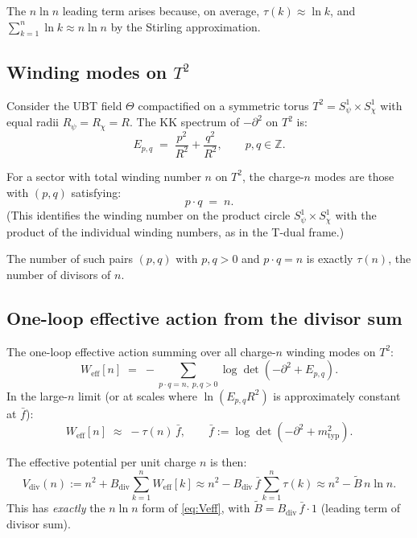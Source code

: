\documentclass[12pt,a4paper]{article}
\theoremstyle{remark}
\newcommand{\ZZ}{\mathbb{Z}}
\begin{document}
The $n\ln n$ leading term arises because, on average,
$\tau(k) \approx \ln k$, and $\sum_{k=1}^n \ln k \approx n\ln n$ by
the Stirling approximation.

\subsection{Winding modes on $T^2$}

Consider the UBT field $\Theta$ compactified on a symmetric torus
$T^2 = S^1_\psi \times S^1_\chi$ with equal radii $R_\psi = R_\chi = R$.
The KK spectrum of $-\partial^2$ on $T^2$ is:
\begin{equation}
  E_{p,q} \;=\; \frac{p^2}{R^2} + \frac{q^2}{R^2},
  \qquad p, q \in \ZZ.
  \label{eq:KK_T2}
\end{equation}

For a sector with total winding number $n$ on $T^2$, the charge-$n$ modes
are those with $(p,q)$ satisfying:
\begin{equation}
  p \cdot q \;=\; n.
  \label{eq:winding_constraint}
\end{equation}
(This identifies the winding number on the product circle $S^1_\psi\times S^1_\chi$
with the product of the individual winding numbers, as in the T-dual frame.)

The number of such pairs $(p,q)$ with $p,q > 0$ and $p\cdot q = n$ is
exactly $\tau(n)$, the number of divisors of $n$.

\subsection{One-loop effective action from the divisor sum}

The one-loop effective action summing over all charge-$n$ winding modes on $T^2$:
\begin{equation}
  W_{\mathrm{eff}}[n]
  \;=\; -\sum_{p\cdot q = n,\; p,q>0}
  \log\det\!\left(-\partial^2 + E_{p,q}\right).
  \label{eq:W_eff}
\end{equation}
In the large-$n$ limit (or at scales where $\ln(E_{p,q}R^2)$ is approximately
constant at $\bar f$):
\begin{equation}
  W_{\mathrm{eff}}[n]
  \;\approx\; -\tau(n)\,\bar{f},
  \qquad \bar{f} := \log\det(-\partial^2 + m_{\mathrm{typ}}^2).
  \label{eq:W_approx}
\end{equation}

The effective potential per unit charge $n$ is then:
\begin{equation}
  V_{\mathrm{div}}(n)
  := n^2 + B_{\mathrm{div}}\sum_{k=1}^{n}W_{\mathrm{eff}}[k]
  \approx n^2 - B_{\mathrm{div}}\,\bar{f}\sum_{k=1}^{n}\tau(k)
  \approx n^2 - \tilde B\,n\ln n.
  \label{eq:Vdiv}
\end{equation}
This has \emph{exactly} the $n\ln n$ form of \eqref{eq:Veff}, with
$\tilde B = B_{\mathrm{div}}\,\bar{f}\cdot 1$ (leading term of divisor sum).
\end{document}
